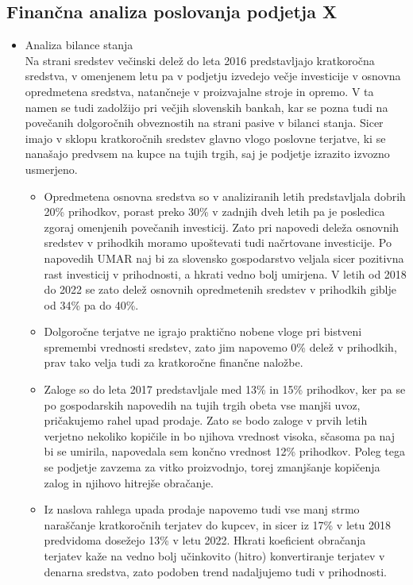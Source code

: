 \documentclass[12pt,a4paper]{amsart}
\theoremstyle{definition} %
\theoremstyle{plain} %
\begin{document}
\subsection{Finančna analiza poslovanja podjetja X}
\begin{itemize}
\item Analiza bilance stanja\\
Na strani sredstev večinski delež do leta 2016 predstavljajo kratkoročna sredstva, v omenjenem letu pa v podjetju izvedejo večje investicije v osnovna opredmetena sredstva, natančneje v proizvajalne stroje in opremo. V ta namen se tudi zadolžijo pri večjih slovenskih bankah, kar se pozna tudi na povečanih dolgoročnih obveznostih na strani pasive v bilanci stanja. Sicer imajo v sklopu kratkoročnih sredstev glavno vlogo poslovne terjatve, ki se nanašajo predvsem na kupce na tujih trgih, saj je podjetje izrazito izvozno usmerjeno. 
\begin{itemize}
\item Opredmetena osnovna sredstva so v analiziranih letih predstavljala dobrih 20\% prihodkov, porast preko 30\% v zadnjih dveh letih pa je posledica zgoraj omenjenih povečanih investicij. Zato pri napovedi deleža osnovnih sredstev v prihodkih moramo upoštevati tudi načrtovane investicije. Po napovedih UMAR naj bi za slovensko gospodarstvo veljala sicer pozitivna rast investicij v prihodnosti, a hkrati vedno bolj umirjena. V letih od 2018 do 2022 se zato delež osnovnih opredmetenih sredstev v prihodkih giblje od 34\% pa do 40\%.
\item Dolgoročne terjatve ne igrajo praktično nobene vloge pri bistveni spremembi vrednosti sredstev, zato jim napovemo 0\% delež v prihodkih, prav tako velja tudi za kratkoročne finančne naložbe.
\item Zaloge so do leta 2017 predstavljale med 13\% in 15\% prihodkov, ker pa se po gospodarskih napovedih na tujih trgih obeta vse manjši uvoz, pričakujemo rahel upad prodaje. Zato se bodo zaloge v prvih letih verjetno nekoliko kopičile in bo njihova vrednost visoka,  sčasoma pa naj bi se umirila, napovedala sem končno vrednost 12\% prihodkov. Poleg tega se podjetje zavzema za vitko proizvodnjo, torej zmanjšanje kopičenja zalog in njihovo hitrejše obračanje.
\item Iz naslova rahlega upada prodaje napovemo tudi vse manj strmo naraščanje kratkoročnih terjatev do kupcev, in sicer iz 17\% v letu 2018 predvidoma dosežejo 13\% v letu 2022. Hkrati koeficient obračanja terjatev kaže na vedno bolj učinkovito (hitro) konvertiranje terjatev v denarna sredstva, zato podoben trend nadaljujemo tudi v prihodnosti.

\end{itemize}
\end{itemize}
\end{document}

